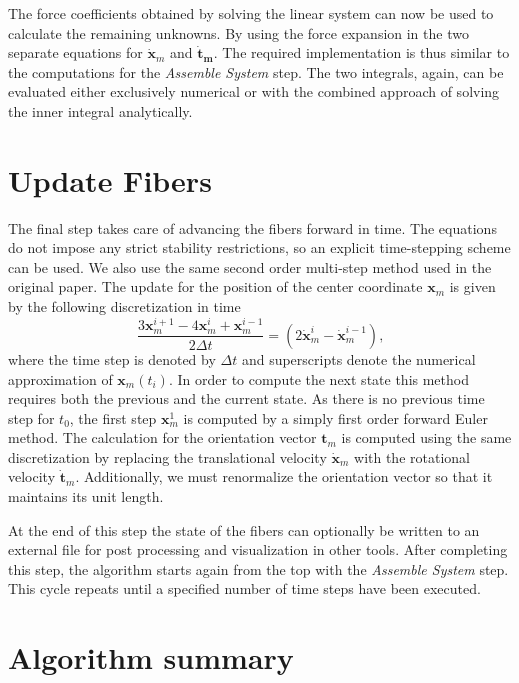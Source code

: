 The force coefficients obtained by solving the linear system can now be used to calculate the remaining unknowns. By using the force expansion in the two separate equations for $\mathbf{\dot{x}}_m$ and $\mathbf{\dot{t}_m}$. The required implementation is thus similar to the computations for the \emph{Assemble System} step. The two integrals, again, can be evaluated either exclusively numerical or with the combined approach of solving the inner integral analytically.

\section{Update Fibers}
\label{sec:serial_update_fibers}

The final step takes care of advancing the fibers forward in time. The equations do not impose any strict stability restrictions, so an explicit time-stepping scheme can be used. We also use the same second order multi-step method used in the original paper. The update for the position of the center coordinate $\mathbf{x}_m$ is given by the following discretization in time
\begin{equation}
  \label{eq:time_discretization}
  \frac{3\mathbf{x}_m^{i+1} - 4\mathbf{x}_m^{i} + \mathbf{x}_m^{i-1}}{2 \Delta t} = (2\mathbf{\dot{x}}_m^{i} - \mathbf{\dot{x}}_m^{i-1}) \text{,}
\end{equation}
where the time step is denoted by $\Delta t$ and superscripts denote the numerical approximation of $\mathbf{x}_m(t_i)$. In order to compute the next state this method requires both the previous and the current state. As there is no previous time step for $t_0$, the first step $\mathbf{x}_{m}^{1}$ is computed by a simply first order forward Euler method. The calculation for the orientation vector $\mathbf{t}_m$ is computed using the same discretization by replacing the translational velocity $\mathbf{\dot{x}}_m$ with the rotational velocity $\mathbf{\dot{t}}_m$. Additionally, we must renormalize the orientation vector so that it maintains its unit length.

At the end of this step the state of the fibers can optionally be written to an external file for post processing and visualization in other tools. After completing this step, the algorithm starts again from the top with the \emph{Assemble System} step. This cycle repeats until a specified number of time steps have been executed.

\section{Algorithm summary}
\label{sec:algorithm_summary}

